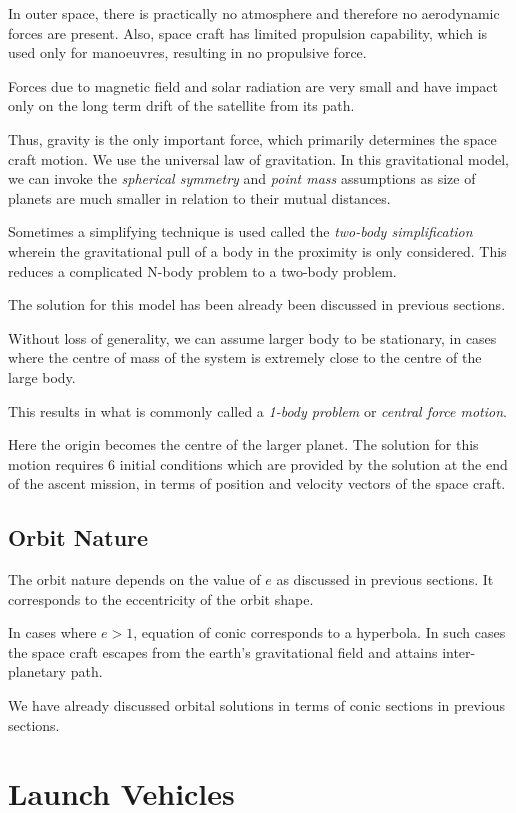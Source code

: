 \documentclass{article}
\theoremstyle{definition}
\begin{document}
In outer space, there is practically no atmosphere and therefore no aerodynamic forces are present.
Also, space craft has limited propulsion capability, which is used only for manoeuvres, resulting in no propulsive force.

Forces due to magnetic field and solar radiation are very small and have impact only on the long term drift of the satellite from its path.

Thus, gravity is the only important force, which primarily determines the space craft motion.
We use the universal law of gravitation.
In this gravitational model, we can invoke the \emph{spherical symmetry} and \emph{point mass} assumptions as size of planets are much smaller in relation to their mutual distances.

Sometimes a simplifying technique is used called the \emph{two-body simplification} wherein the gravitational pull of a body in the proximity is only considered. This reduces a complicated N-body problem to a two-body problem. 

The solution for this model has been already been discussed in previous sections.

Without loss of generality, we can assume larger body to be stationary, in cases where the centre of mass of the system is extremely close to the centre of the large body.

This results in what is commonly called a \emph{1-body problem} or \emph{central force motion}.

Here the origin becomes the centre of the larger planet.
The solution for this motion requires 6 initial conditions which are provided by the solution at the end of the ascent mission, in terms of position and velocity vectors of the space craft.


\subsection{Orbit Nature}

The orbit nature depends on the value of $e$ as discussed in previous sections.
It corresponds to the eccentricity of the orbit shape.

In cases where $e>1$, equation of conic corresponds to a hyperbola. In such cases the space craft escapes from the earth's gravitational field and attains inter-planetary path.

We have already discussed orbital solutions in terms of conic sections in previous sections.

\section{Launch Vehicles}
\end{document}

